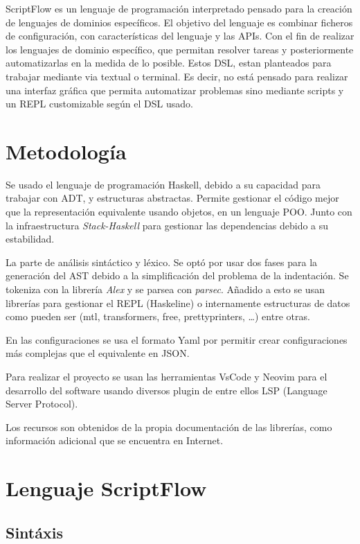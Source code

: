 \documentclass[11pt]{article}
\begin{document}
ScriptFlow es un lenguaje de programación interpretado pensado para la creación de lenguajes de dominios específicos. El objetivo del
lenguaje es combinar ficheros de configuración, con características del lenguaje y las APIs. Con el fin de realizar los lenguajes de dominio específico,
que permitan resolver tareas y posteriormente automatizarlas en la medida de lo posible. Estos DSL, estan planteados
para trabajar mediante via textual o terminal. Es decir, no está pensado para realizar una interfaz gráfica que permita automatizar problemas sino mediante
scripts y un REPL customizable según el DSL usado.

\section{Metodología}
\label{sec:org800bf68}

Se usado el lenguaje de programación Haskell, debido a su capacidad para trabajar con ADT, y estructuras abstractas. Permite gestionar
el código mejor que la representación equivalente usando objetos, en un lenguaje POO. Junto con la infraestructura \emph{Stack-Haskell} para
gestionar las dependencias debido a su estabilidad.

La parte de análisis sintáctico y léxico. Se optó por usar dos fases para la generación del AST
debido a la simplificación del problema de la indentación. Se tokeniza con la librería \emph{Alex} y se parsea con \emph{parsec}.
Añadido a esto se usan librerías para gestionar el REPL (Haskeline) o internamente estructuras de datos como pueden ser (mtl, transformers, free, prettyprinters, \ldots{})
entre otras.

En las configuraciones se usa el formato Yaml por permitir crear configuraciones más complejas que el equivalente en JSON.

Para realizar el proyecto se usan las herramientas VsCode y Neovim para el desarrollo del software usando diversos
plugin de entre ellos LSP (Language Server Protocol).

Los recursos son obtenidos de la propia documentación de las librerías, como información adicional que se encuentra en Internet.

\section{Lenguaje ScriptFlow}
\label{sec:org4a6b588}

\subsection{Sintáxis}
\label{sec:org82dcecf}
\end{document}
